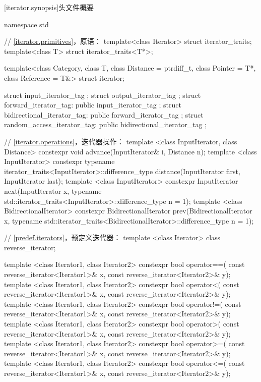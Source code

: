 [iterator.synopsis]{头文件概要}

%
\begin{codeblock}
namespace std {
  // \ref{iterator.primitives}，原语：
  template<class Iterator> struct iterator_traits;
  template<class T> struct iterator_traits<T*>;

  template<class Category, class T, class Distance = ptrdiff_t,
       class Pointer = T*, class Reference = T&> struct iterator;

  struct input_iterator_tag { };
  struct output_iterator_tag { };
  struct forward_iterator_tag: public input_iterator_tag { };
  struct bidirectional_iterator_tag: public forward_iterator_tag { };
  struct random_access_iterator_tag: public bidirectional_iterator_tag { };

  // \ref{iterator.operations}，迭代器操作：
  template <class InputIterator, class Distance>
    constexpr void advance(InputIterator& i, Distance n);
  template <class InputIterator>
    constexpr typename iterator_traits<InputIterator>::difference_type
    distance(InputIterator first, InputIterator last);
  template <class InputIterator>
    constexpr InputIterator next(InputIterator x,
      typename std::iterator_traits<InputIterator>::difference_type n = 1);
  template <class BidirectionalIterator>
    constexpr BidirectionalIterator prev(BidirectionalIterator x,
      typename std::iterator_traits<BidirectionalIterator>::difference_type n = 1);

  // \ref{predef.iterators}，预定义迭代器：
  template <class Iterator> class reverse_iterator;

  template <class Iterator1, class Iterator2>
    constexpr bool operator==(
      const reverse_iterator<Iterator1>& x,
      const reverse_iterator<Iterator2>& y);
  template <class Iterator1, class Iterator2>
    constexpr bool operator<(
      const reverse_iterator<Iterator1>& x,
      const reverse_iterator<Iterator2>& y);
  template <class Iterator1, class Iterator2>
    constexpr bool operator!=(
      const reverse_iterator<Iterator1>& x,
      const reverse_iterator<Iterator2>& y);
  template <class Iterator1, class Iterator2>
    constexpr bool operator>(
      const reverse_iterator<Iterator1>& x,
      const reverse_iterator<Iterator2>& y);
  template <class Iterator1, class Iterator2>
    constexpr bool operator>=(
      const reverse_iterator<Iterator1>& x,
      const reverse_iterator<Iterator2>& y);
  template <class Iterator1, class Iterator2>
    constexpr bool operator<=(
      const reverse_iterator<Iterator1>& x,
      const reverse_iterator<Iterator2>& y);

}
\end{codeblock}
